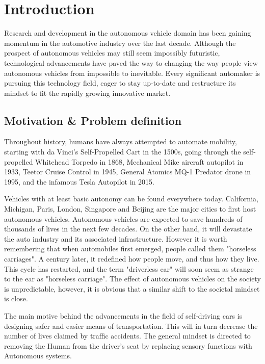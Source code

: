 \chapter{Introduction}%
Research and development in the autonomous vehicle domain has been gaining momentum in the automotive industry over the last decade. Although the prospect of autonomous vehicles may still seem impossibly futuristic, technological advancements have paved the way to changing the way people view autonomous vehicles from impossible to inevitable. Every significant automaker is pursuing this technology field, eager to stay up-to-date and restructure its mindset to fit the rapidly growing innovative market.

\section{Motivation \& Problem definition}
Throughout history, humans have always attempted to automate mobility, starting with da Vinci's Self-Propelled Cart in the 1500s, going through the self-propelled Whitehead Torpedo in 1868, Mechanical Mike aircraft autopilot in 1933, Teetor Cruise Control in 1945, General Atomics MQ-1 Predator drone in 1995, and the infamous Tesla Autopilot in 2015.

Vehicles with at least basic autonomy can be found everywhere today. California, Michigan, Paris, London, Singapore and Beijing are the major cities to first host autonomous vehicles. Autonomous vehicles are expected to save hundreds of thousands of lives in the next few decades. On the other hand, it will devastate the auto industry and its associated infrastructure. However it is worth remembering that when automobiles first emerged, people called them "horseless carriages". A century later, it redefined how people move, and thus how they live. This cycle has restarted, and the term "driverless car" will soon seem as strange to the ear as "horseless carriage". The effect of autonomous vehicles on the society is unpredictable, however, it is obvious that a similar shift to the societal mindset is close.

The main motive behind the advancements in the field of self-driving cars is designing safer and easier means of transportation. This will in turn decrease the number of lives claimed by traffic accidents. The general mindset is directed to removing the Human from the driver’s seat by replacing sensory functions with Autonomous systems.


